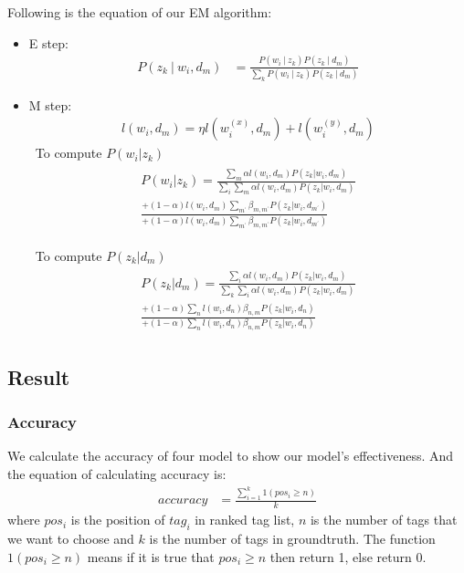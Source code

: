 Following is the equation of our EM algorithm:
\begin{itemize}
\item E step:
\begin{align}
    P(z_{k}\ |\ w_{i},d_{m}) & = \frac{P(w_{i}\ |\ z_{k})P(z_{k}\ |\ d_{m})}{\sum_{k}P(w_{i}\ |\ z_{k})P(z_{k}\ |\ d_{m})}
\end{align}
\item M step:
\begin{align}
    l(w_{i},d_{m}) = \eta l(w_{i}^{(x)},d_{m})+l(w_{i}^{(y)},d_{m})
\end{align}
 \ To compute $P(w_{i}|z_{k})$
\begin{align}
\begin{split}
    P(w_{i}|z_{k})  =
  \frac{ \sum_{m}\alpha l(w_{i},d_{m})P(z_{k}|w_{i},d_{m})}
  {\sum_{i} \sum_{m} \alpha l(w_{i},d_{m})P(z_{k}|w_{i},d_{m})}\\
  \frac{ +(1-\alpha)l(w_{i},d_{m})\sum_{m^{'}}\beta_{m,m^{'}}P(z_{k}|w_{i},d_{m^{'}})}{ +(1-\alpha)l(w_{i},d_{m})\sum_{m^{'}}\beta_{m,m^{'}}P(z_{k}|w_{i},d_{m^{'}}) }
\end{split}
\end{align}

 \ To compute $P(z_{k}|d_{m})$
\begin{align}
\begin{split}
    P(z_{k}|d_{m})  =
  \frac{ \sum_{i}\alpha l(w_{i},d_{m})P(z_{k}|w_{i},d_{m})}
  {\sum_{k} \sum_{i} \alpha l(w_{i},d_{m})P(z_{k}|w_{i},d_{m})}\\
  \frac{ +(1-\alpha)\sum_{n}l(w_{i},d_{n})\beta_{n,m}P(z_{k}|w_{i},d_{n})}{ +(1-\alpha)\sum_{n}l(w_{i},d_{n})\beta_{n,m}P(z_{k}|w_{i},d_{n}) }
\end{split}
\end{align}

\end{itemize}
\subsection{Result}

\subsubsection{Accuracy}
We calculate the accuracy of four model to show our model's effectiveness. And the equation of calculating accuracy is:
\begin{align}
    accuracy & = \frac{\sum_{i=1}^{k}1(pos_{i} \geq n)}{k}
\end{align}
where $pos_{i}$ is the position of $tag_{i}$ in ranked tag list, $n$ is the number of tags that we want to choose and $k$ is the number of tags in groundtruth. The function $1(pos_{i} \geq n)$ means if it is true that $pos_{i} \geq n$ then return 1, else return 0.


